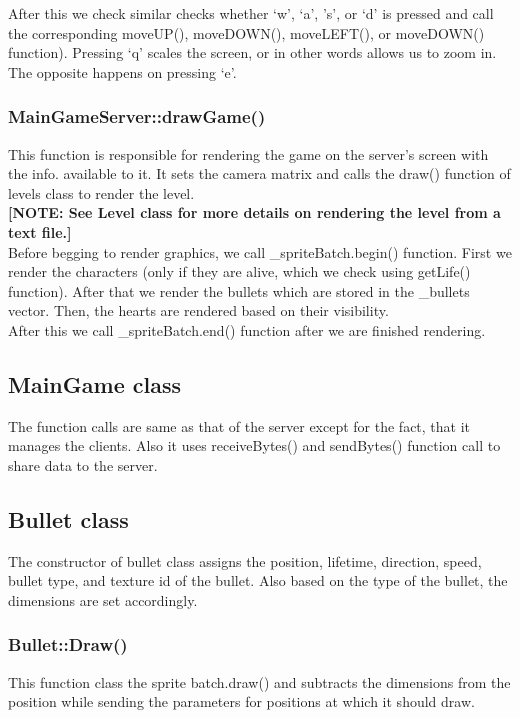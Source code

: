 \documentclass{article}
\begin{document}
After this we check similar checks whether ‘w’, ‘a’, ’s’, or ‘d’ is pressed and call the corresponding moveUP(), moveDOWN(), moveLEFT(), or moveDOWN() function). Pressing ‘q’ scales the screen, or in other words allows us to zoom in. The opposite happens on pressing ‘e’.
\newline

\subsubsection{MainGameServer::drawGame() }
This function is responsible for rendering the game on the server’s screen with the info. available to it. It sets the camera matrix and calls the draw() function of levels class to render the level. \\

\textbf{[NOTE: See Level class for more details on rendering the level from a text file.]} \\

Before begging to render graphics, we call \_spriteBatch.begin() function. First we render the characters (only if they are alive, which we check using getLife() function). After that we render the bullets which are stored in the \_bullets vector. Then, the hearts are rendered based on their visibility. \\

After this we call \_spriteBatch.end() function after we are finished rendering.
\newline

\subsection{MainGame class}
The function calls are same as that of the server except for the fact, that it manages the clients. Also it uses receiveBytes() and sendBytes() function call to share data to the server.
\newline

\subsection{Bullet class}
The constructor of bullet class assigns the position, lifetime, direction, speed, bullet type, and texture id of the bullet. Also based on the type of the bullet, the dimensions are set accordingly.
\newline

\subsubsection{Bullet::Draw()}
This function class the sprite batch.draw() and subtracts the dimensions from the position while sending the parameters for positions at which it should draw.
 \\
 
\end{document}
